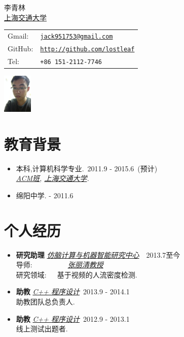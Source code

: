 \documentclass[letterpaper]{article}
\def\cname{李青林}
\begin{document}
\begin{minipage}{0.35\linewidth}
  {\huge  \cname}
  \vspace{0.1in} \\
  \href{http://www.sjtu.edu.cn/}{上海交通大学}
\end{minipage}
\begin{minipage}{0.45\linewidth}
  \begin{tabular}{ll}
    Gmail:  & \href{mailto:jack951753@gmail.com}{\tt jack951753@gmail.com} \\
    GitHub: & \href{https://github.com/lostleaf}{\tt http://github.com/lostleaf} \\
    Tel:    & {\tt +86 151-2112-7746}
  \end{tabular}
\end{minipage}
\begin{minipage}{0.45\linewidth}
\includegraphics[width=40pt]{photo}
\end{minipage}




\section*{教育背景}

\begin{itemize}

\item  本科,计算机科学专业.\quad\quad~2011.9 - 2015.6~(预计) \\
    \emph{\href{http://acm.sjtu.edu.cn}{ACM班},
    \href{http://www.sjtu.edu.cn/}{上海交通大学}.}
\item
    绵阳中学.\qquad\qquad\qquad{} - 2011.6
\end{itemize}

\section*{个人经历}
\begin{itemize}
\item \textbf{研究助理} \emph{\href{http://bcmi.sjtu.edu.cn}{仿脑计算与机器智能研究中心}}\qquad\qquad\qquad~~2013.7至今\\
    导师:~~~~~~~~~~\emph{\href{http://bcmi.sjtu.edu.cn/~zhangliqing/}{张丽清教授}}\\
    研究领域:~~~基于视频的人流密度检测.
\item \textbf{助教}  \emph{\href{http://acm.sjtu.edu.cn/wiki/Programming_2013}{C++ 程序设计}}\qquad\qquad\qquad\qquad\qquad\qquad\quad\qquad~2013.9 - 2014.1\\
助教团队总负责人.
\item \textbf{助教}  \emph{\href{http://acm.sjtu.edu.cn/wiki/Programming_2013}{C++ 程序设计}}\qquad\qquad\qquad\qquad\qquad\qquad\quad\qquad~2012.9 - 2013.1\\
线上测试出题者.
\end{itemize}
\end{document}
